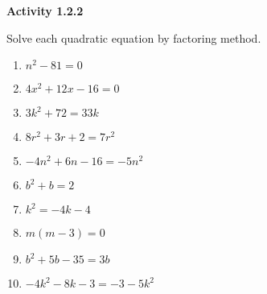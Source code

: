 \noindent\textbf{Activity 1.2.2}

\vspace{0.75ex}

Solve each quadratic equation by factoring method.

\begin{multicols}{2}
\begin{enumerate}[label = \color{blue}\arabic*. ]
   \item $ n^2 - 81 = 0 $
   \item $ 4x^2 + 12x - 16 = 0 $
   \item $ 3k^2 + 72 = 33k $
   \item $ 8r^2 + 3r + 2 = 7r^2 $
   \item $ -4n^2 + 6n - 16 = -5n^2 $
   \item $ b^2 + b = 2 $
   \item $ k^2 = -4k - 4 $
   \item $ m(m - 3) = 0 $
   \item $ b^2 + 5b - 35 = 3b $
   \item $ -4k^2 - 8k - 3 = -3 - 5k^2 $
\end{enumerate}
\end{multicols}
				
				

